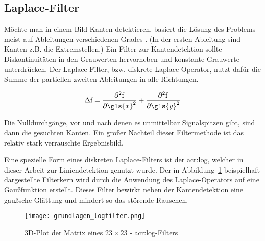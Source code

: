 \subsection{Laplace-Filter} \label{ssec:laplaceFilter}

Möchte man in einem Bild Kanten detektieren, basiert die Lösung des Problems meist auf Ableitungen verschiedenen Grades \autocite[S.~360ff]{jaehneDigitaleBildverarbeitungMit2005}. (In der ersten Ableitung sind Kanten z.B. die Extremstellen.) Ein Filter zur Kantendetektion sollte Diskontinuitäten in den Grauwerten hervorheben und konstante Grauwerte unterdrücken. Der Laplace-Filter, bzw. diskrete Laplace-Operator, nutzt dafür die Summe der partiellen zweiten Ableitungen in alle Richtungen. \autocite[S.~90]{papulaMathematikFuerIngenieure2016}

\begin{equation}
\Delta \mathrm{f} = \frac{\partial^2 \mathrm{f}}{\partial {\gls{x}}^2} + \frac{\partial^2 \mathrm{f}}{\partial {\gls{y}}^2}
\end{equation}

Die Nulldurchgänge, vor und nach denen es unmittelbar Signalspitzen gibt, sind dann die gesuchten Kanten. Ein großer Nachteil dieser Filtermethode ist das relativ stark verrauschte Ergebnisbild.

Eine spezielle Form eines diskreten Laplace-Filters ist der \gls{acr:log}, welcher in dieser Arbeit zur Liniendetektion genutzt wurde. Der in Abbildung~\ref{fig:grundlagen_logfilter} beispielhaft dargestellte Filterkern wird durch die Anwendung des Laplace-Operators auf eine Gaußfunktion erstellt. Dieses Filter bewirkt neben der Kantendetektion eine gaußsche Glättung und mindert so das störende Rauschen.

\begin{figure}[H] %
  \centering
  \texttt{[image: grundlagen\_logfilter.png]}
  \caption{3D-Plot der Matrix eines \( 23\times23\) - \gls{acr:log}-Filters}
  \label{fig:grundlagen_logfilter}
\end{figure}  

